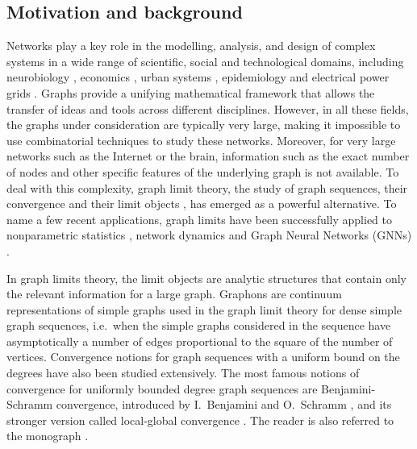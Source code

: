 \documentclass[11pt]{article}
\begin{document}
\subsection{Motivation and background}
Networks play a key role in the modelling, analysis, and design of complex systems in a wide range of scientific, social and technological domains, including neurobiology \cite{fornito_2016_fundamentals}, economics \cite{hausmann_2013_atlas, battiston_2012_debtrank}, urban systems \cite{barthelemy_2016_structure}, epidemiology \cite{pastor-satorras_2015_epidemic} and electrical power grids \cite{pagani_2013_power}. Graphs provide a unifying mathematical framework that allows the transfer of ideas and tools across different disciplines. However, in all these fields, the graphs under consideration are typically very large, making it impossible to use combinatorial techniques to study these networks. Moreover, for very large networks such as the Internet or the brain, information such as the exact number of nodes and other specific features of the underlying graph is not available. To deal with this complexity, graph limit theory, the study of graph sequences, their convergence and their limit objects \cite{LovaszGraphLimits}, has emerged as a powerful alternative. To name a few recent applications, graph limits have been successfully applied to nonparametric statistics \cite{wolfe2013nonparametricgraphonestimation,BorgsNonparaStat}, network dynamics \cite{Kuehn_2020GraphlimitDynam1,Kuehn_2019GraphlimitDynam2,bramburger2023pattern,MedvedevGraphLimitDynamics2,MedvedevGraphLimitDynamics1,gkogkas2022mean,bick2024dynamicalGraphLimi,ayi2023graphlimitinteractingparticle,ayi2024meanfieldlimitnonexchangeablemultiagent,kuehn2022vlasov,jabin2021meanfield} and Graph Neural Networks (GNNs) \cite{keriven2024functions,NEURIPS2023_8154c89c,maskey2022generalization,maskey2023transferability,le2023poincar,levie2024graphon}. 


In graph limits theory, the limit objects are analytic structures that contain only the relevant information for a large graph. Graphons \cite{BORGS20081801,Lovsz2007SzemerdisLF, LOVASZ2006933,borgs2011convergentAnnals} are continuum representations of simple graphs used in the graph limit theory for dense simple graph sequences, i.e.\ when the simple graphs considered in the sequence have asymptotically a number of edges proportional to the square of the number of vertices. Convergence notions for graph sequences with a uniform bound on the degrees have also been studied extensively. The most famous notions of convergence for uniformly bounded degree graph sequences are Benjamini-Schramm convergence, introduced by I.\ Benjamini and O.\ Schramm \cite{BenjaminiLimit}, and its stronger version called local-global convergence \cite{local-global1,Hatami2014LimitsOL}. The reader is also referred to the monograph \cite{LovaszGraphLimits}.
\end{document}
